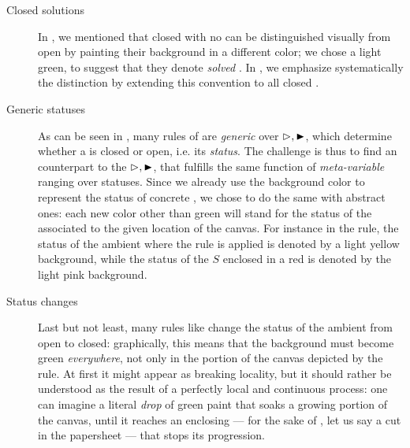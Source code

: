 \begin{description}
  \item[Closed solutions] In , we mentioned that closed
 with no   can be distinguished visually from open
 by painting their background in a different color; we chose a light
green, to suggest that they denote \emph{solved} . In
, we emphasize systematically the distinction by extending
this convention to all closed .
  \item[Generic statuses] As can be seen in , many rules of
 are \emph{generic} over  $\J, \JB$, which
determine whether a  is closed or open, i.e. its \emph{status}. The
challenge is thus to find an  counterpart to the  $\J, \JB$, that
fulfills the same function of \emph{meta-variable} ranging over 
statuses. Since we already use the background color to represent the status of
concrete , we chose to do the same with abstract ones: each new color
other than green will stand for the status of the  associated to the
given location of the canvas. For instance in the 
rule, the status of the ambient  where the rule is applied is denoted by
a light yellow background, while the status of the  $S$ enclosed in a
red  is denoted by the light pink background.
  \item[Status changes] Last but not least, many rules like  change
the status of the ambient  from open to closed: graphically, this means
that the background must become green \emph{everywhere}, not only in the portion
of the canvas depicted by the rule. At first it might appear as breaking
locality, but it should rather be understood as the result of a perfectly local
and continuous process: one can imagine a literal \emph{drop} of green paint
that soaks a growing portion of the canvas, until it reaches an enclosing 
--- for the sake of , let us say a cut in the papersheet --- that
stops its progression.
\end{description}

